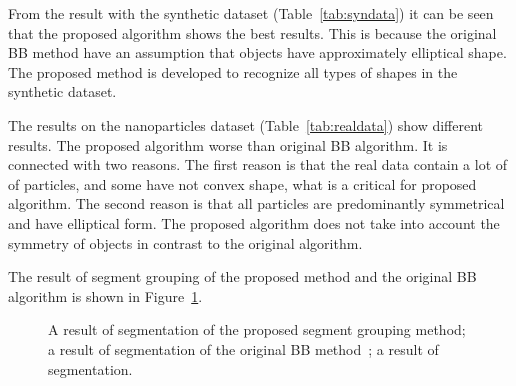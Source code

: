 \documentclass{lutmscthesis}[2010/09/22]
\begin{document}
From the result with the synthetic dataset (Table~\ref{tab:syndata}) it can be seen that
the proposed algorithm shows the best results. This is because the original BB method have an assumption that objects have approximately elliptical shape. The proposed method is developed to recognize all types of shapes in the synthetic dataset.


The results on the nanoparticles dataset (Table~\ref{tab:realdata}) show different results. The proposed algorithm worse than original BB algorithm. It is connected with two reasons. The first reason is that the real data contain a lot of of particles, and some have not convex shape, what is a critical for proposed algorithm. The second reason is that all particles are predominantly symmetrical and have elliptical form. The proposed algorithm does not take into account the symmetry of objects in contrast to the original algorithm.

The result of segment grouping of the proposed method and the original BB algorithm is shown in Figure~\ref{fig:comparing}.

\begin{figure}[ht]
    \centering
    
    
    \caption[]{
         A result of segmentation of the proposed segment grouping method;
         a result of segmentation of the original BB method~\cite{zafari-bb};
         a result of segmentation.
    }
         
    \label{fig:comparing}
\end{figure}
\end{document}
